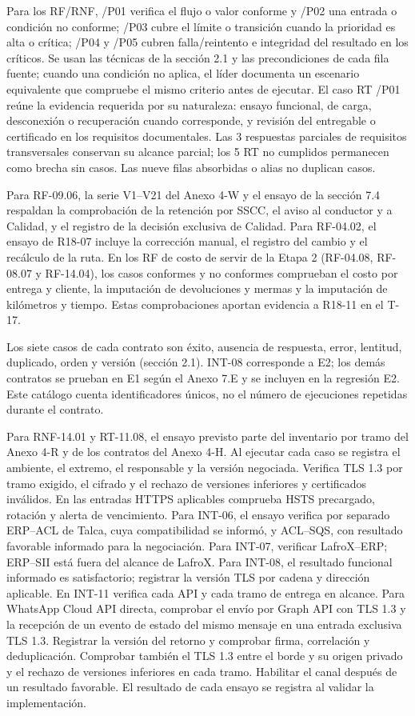 Para los RF/RNF, /P01 verifica el flujo o valor conforme y /P02 una entrada o condición no conforme; /P03 cubre el límite o transición cuando la prioridad es alta o crítica; /P04 y /P05 cubren falla/reintento e integridad del resultado en los críticos. Se usan las técnicas de la sección 2.1 y las precondiciones de cada fila fuente; cuando una condición no aplica, el líder documenta un escenario equivalente que compruebe el mismo criterio antes de ejecutar. El caso RT /P01 reúne la evidencia requerida por su naturaleza: ensayo funcional, de carga, desconexión o recuperación cuando corresponde, y revisión del entregable o certificado en los requisitos documentales. Las 3 respuestas parciales de requisitos transversales conservan su alcance parcial; los 5 RT no cumplidos permanecen como brecha sin casos. Las nueve filas absorbidas o alias no duplican casos.

Para RF-09.06, la serie V1–V21 del Anexo 4-W y el ensayo de la sección 7.4 respaldan la comprobación de la retención por SSCC, el aviso al conductor y a Calidad, y el registro de la decisión exclusiva de Calidad. Para RF-04.02, el ensayo de R18-07 incluye la corrección manual, el registro del cambio y el recálculo de la ruta. En los RF de costo de servir de la Etapa 2 (RF-04.08, RF-08.07 y RF-14.04), los casos conformes y no conformes comprueban el costo por entrega y cliente, la imputación de devoluciones y mermas y la imputación de kilómetros y tiempo. Estas comprobaciones aportan evidencia a R18-11 en el T-17.

Los siete casos de cada contrato son éxito, ausencia de respuesta, error, lentitud, duplicado, orden y versión (sección 2.1). INT-08 corresponde a E2; los demás contratos se prueban en E1 según el Anexo 7.E y se incluyen en la regresión E2. Este catálogo cuenta identificadores únicos, no el número de ejecuciones repetidas durante el contrato.

Para RNF-14.01 y RT-11.08, el ensayo previsto parte del inventario por tramo del Anexo 4-R y de los contratos del Anexo 4-H. Al ejecutar cada caso se registra el ambiente, el extremo, el responsable y la versión negociada. Verifica TLS 1.3 por tramo exigido, el cifrado y el rechazo de versiones inferiores y certificados inválidos. En las entradas HTTPS aplicables comprueba HSTS precargado, rotación y alerta de vencimiento. Para INT-06, el ensayo verifica por separado ERP--ACL de Talca, cuya compatibilidad se informó, y ACL--SQS, con resultado favorable informado para la negociación. Para INT-07, verificar LafroX--ERP; ERP--SII está fuera del alcance de LafroX. Para INT-08, el resultado funcional informado es satisfactorio; registrar la versión TLS por cadena y dirección aplicable. En INT-11 verifica cada API y cada tramo de entrega en alcance. Para WhatsApp Cloud API directa, comprobar el envío por Graph API con TLS 1.3 y la recepción de un evento de estado del mismo mensaje en una entrada exclusiva TLS 1.3. Registrar la versión del retorno y comprobar firma, correlación y deduplicación. Comprobar también el TLS 1.3 entre el borde y su origen privado y el rechazo de versiones inferiores en cada tramo. Habilitar el canal después de un resultado favorable. El resultado de cada ensayo se registra al validar la implementación.

